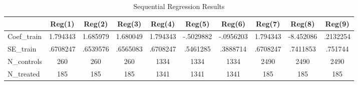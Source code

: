 \begin{table}[htbp]\centering
\caption{Sequential Regression Results}
\begin{tabular}{l*{9}{c}}
\hline\hline
            &      Reg(1)&      Reg(2)&      Reg(3)&      Reg(4)&      Reg(5)&      Reg(6)&      Reg(7)&      Reg(8)&      Reg(9)\\
\hline
Coef\_train  &    1.794343&    1.685979&    1.680049&    1.794343&   -.5029882&   -.0956203&    1.794343&   -8.452086&    .2132254\\
SE\_train    &    .6708247&    .6539576&    .6565083&    .6708247&    .5461285&    .3888714&    .6708247&    .7411853&     .751744\\
N\_controls  &         260&         260&         260&        1334&        1334&        1334&        2490&        2490&        2490\\
N\_treated   &         185&         185&         185&        1341&        1341&        1341&         185&         185&         185\\
\hline\hline
\end{tabular}
\end{table}
